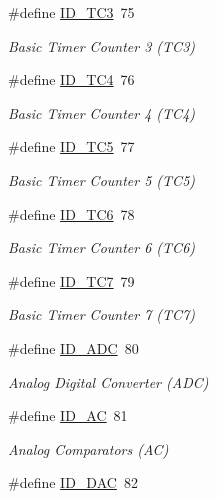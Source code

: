 \begin{DoxyCompactItemize}
\#define \mbox{\hyperlink{group___s_a_m_d21_j15_b__id_gac978ebe37e0ce9dfe2eec2f15ab83015}{I\+D\+\_\+\+T\+C3}}~75
\begin{DoxyCompactList}\small\item\em Basic Timer Counter 3 (T\+C3) \end{DoxyCompactList}\item 
\#define \mbox{\hyperlink{group___s_a_m_d21_j15_b__id_ga59ecaec462139ce30c8ebe1dc25f9f7d}{I\+D\+\_\+\+T\+C4}}~76
\begin{DoxyCompactList}\small\item\em Basic Timer Counter 4 (T\+C4) \end{DoxyCompactList}\item 
\#define \mbox{\hyperlink{group___s_a_m_d21_j15_b__id_ga60408f0e4285fc6e0e837aad86b862f8}{I\+D\+\_\+\+T\+C5}}~77
\begin{DoxyCompactList}\small\item\em Basic Timer Counter 5 (T\+C5) \end{DoxyCompactList}\item 
\#define \mbox{\hyperlink{group___s_a_m_d21_j15_b__id_gac63b3ed5c54573b3c93943a3e2b33a3a}{I\+D\+\_\+\+T\+C6}}~78
\begin{DoxyCompactList}\small\item\em Basic Timer Counter 6 (T\+C6) \end{DoxyCompactList}\item 
\#define \mbox{\hyperlink{group___s_a_m_d21_j15_b__id_ga2e026ba57161127b95e270fa8d6ea327}{I\+D\+\_\+\+T\+C7}}~79
\begin{DoxyCompactList}\small\item\em Basic Timer Counter 7 (T\+C7) \end{DoxyCompactList}\item 
\#define \mbox{\hyperlink{group___s_a_m_d21_j15_b__id_gafb7efa537d1d64419483b97f642009fd}{I\+D\+\_\+\+A\+DC}}~80
\begin{DoxyCompactList}\small\item\em Analog Digital Converter (A\+DC) \end{DoxyCompactList}\item 
\#define \mbox{\hyperlink{group___s_a_m_d21_j15_b__id_ga20fe08f8d0b2a4e6c0dbb2371aacadb0}{I\+D\+\_\+\+AC}}~81
\begin{DoxyCompactList}\small\item\em Analog Comparators (AC) \end{DoxyCompactList}\item 
\#define \mbox{\hyperlink{group___s_a_m_d21_j15_b__id_ga2561118247335c13b56f7a79a17fceff}{I\+D\+\_\+\+D\+AC}}~82

\end{DoxyCompactItemize}
